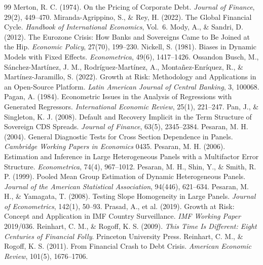 \begin{thebibliography}{99}
 Merton, R. C. (1974). On the Pricing of Corporate Debt. \textit{Journal of Finance}, 29(2), 449--470.
 Miranda-Agrippino, S., \& Rey, H. (2022). The Global Financial Cycle. \textit{Handbook of International Economics}, Vol.\ 6.
 Mody, A., \& Sandri, D. (2012). The Eurozone Crisis: How Banks and Sovereigns Came to Be Joined at the Hip. \textit{Economic Policy}, 27(70), 199--230.
 Nickell, S. (1981). Biases in Dynamic Models with Fixed Effects. \textit{Econometrica}, 49(6), 1417--1426.
 Ossandon Busch, M., Sánchez-Martínez, J. M., Rodríguez-Martínez, A., Montañez-Enríquez, R., \& Martínez-Jaramillo, S. (2022). Growth at Risk: Methodology and Applications in an Open-Source Platform. \textit{Latin American Journal of Central Banking}, 3, 100068.
 Pagan, A. (1984). Econometric Issues in the Analysis of Regressions with Generated Regressors. \textit{International Economic Review}, 25(1), 221--247.
 Pan, J., \& Singleton, K. J. (2008). Default and Recovery Implicit in the Term Structure of Sovereign CDS Spreads. \textit{Journal of Finance}, 63(5), 2345--2384.
 Pesaran, M. H. (2004). General Diagnostic Tests for Cross Section Dependence in Panels. \textit{Cambridge Working Papers in Economics} 0435.
 Pesaran, M. H. (2006). Estimation and Inference in Large Heterogeneous Panels with a Multifactor Error Structure. \textit{Econometrica}, 74(4), 967--1012.
 Pesaran, M. H., Shin, Y., \& Smith, R. P. (1999). Pooled Mean Group Estimation of Dynamic Heterogeneous Panels. \textit{Journal of the American Statistical Association}, 94(446), 621--634.
 Pesaran, M. H., \& Yamagata, T. (2008). Testing Slope Homogeneity in Large Panels. \textit{Journal of Econometrics}, 142(1), 50--93.
 Prasad, A., et al. (2019). Growth at Risk: Concept and Application in IMF Country Surveillance. \textit{IMF Working Paper} 2019/036.
 Reinhart, C. M., \& Rogoff, K. S. (2009). \textit{This Time Is Different: Eight Centuries of Financial Folly}. Princeton University Press.
 Reinhart, C. M., \& Rogoff, K. S. (2011). From Financial Crash to Debt Crisis. \textit{American Economic Review}, 101(5), 1676--1706.

\end{thebibliography}
